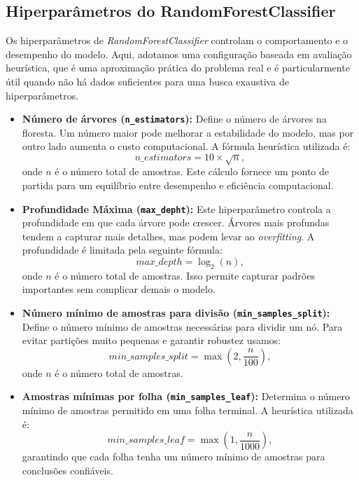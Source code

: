 \documentclass[a4paper,12pt]{article}
\begin{document}
\subsection{Hiperparâmetros do RandomForestClassifier}
Os hiperparâmetros de \textit{RandomForestClassifier} controlam o comportamento e o desempenho do modelo. Aqui, adotamos uma configuração baseada em avaliação heurística, que é uma aproximação prática do problema real e é particularmente útil quando não há dados suficientes para uma busca exaustiva de hiperparâmetros.

\begin{itemize}
    \item \textbf{Número de árvores (\texttt{n\_estimators}):} Define o número de árvores na floresta. Um número maior pode melhorar a estabilidade do modelo, mas por outro lado aumenta o custo computacional. A fórmula heurística utilizada é:
    \begin{equation}
    n\_estimators = 10 \times \sqrt{n},
    \end{equation}
    onde \( n \) é o número total de amostras. Este cálculo fornece um ponto de partida para um equilíbrio entre desempenho e eficiência computacional.

    \item \textbf{Profundidade Máxima (\texttt{max\_depht}):} Este hiperparâmetro controla a profundidade em que cada árvore pode crescer. Árvores mais profundas tendem a capturar mais detalhes, mas podem levar ao \textit{overfitting}. A profundidade é limitada pela seguinte fórmula:
    \begin{equation}
    max\_depth = \log_2(n),
    \end{equation}
    onde \( n \) é o número total de amostras. Isso permite capturar padrões importantes sem complicar demais o modelo.

    \item \textbf{Número mínimo de amostras para divisão (\texttt{min\_samples\_split}):} Define o número mínimo de amostras necessárias para dividir um nó. Para evitar partições muito pequenas e garantir robustez usamos:
    \begin{equation}
    min\_samples\_split = \max(2, \frac{n}{100}),
    \end{equation}
    onde \( n \) é o número total de amostras.

    \item \textbf{Amostras mínimas por folha (\texttt{min\_samples\_leaf}):} Determina o número mínimo de amostras permitido em uma folha terminal. A heurística utilizada é:
    \begin{equation}
    min\_samples\_leaf = \max(1, \frac{n}{1000}),
    \end{equation}
    garantindo que cada folha tenha um número mínimo de amostras para conclusões confiáveis.


\end{itemize}
\end{document}
